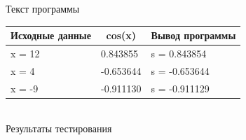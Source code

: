 \documentclass[a4paper,14pt]{extarticle}
\begin{document}

\begin{center}
Текст программы
\end{center}
\begin{center}
\begin{tabular}{|l|l|l|}
\hline
\multicolumn{1}{|c|}{Исходные данные}&\multicolumn{1}{|c|}{cos(x)}& \multicolumn{1}{|c|}{Вывод программы}\\
\hline
x = 12 & 0.843855 & s = 0.843854\\
x = 4 & -0.653644 & s = -0.653644\\
x = -9 & -0.911130 & s = -0.911129\\
\hline
\end{tabular}\\
\vspace{0.3cm}
Результаты тестирования
\end{center}
\end{document}
